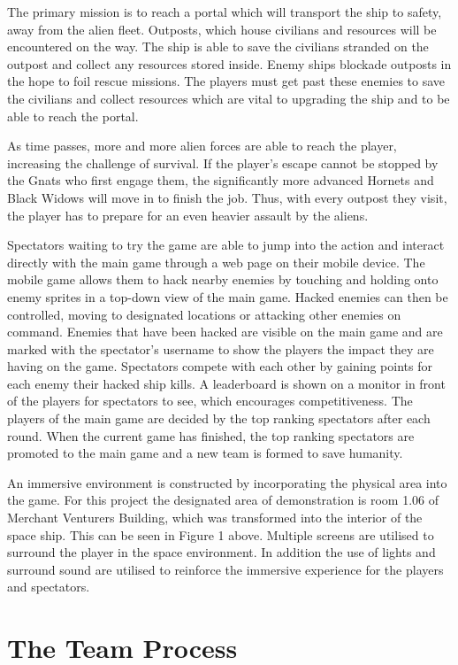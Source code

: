 \documentclass[a4paper,11pt]{article}
\begin{document}
The primary mission is to reach a portal which will transport the ship to safety, away from the alien fleet. Outposts, which house civilians and resources will be encountered on the way. The ship is able to save the civilians stranded on the outpost and collect any resources stored inside. Enemy ships blockade outposts in the hope to foil rescue missions. The players must get past these enemies to save the civilians and collect resources which are vital to upgrading the ship and to be able to reach the portal.

As time passes, more and more alien forces are able to reach the player, increasing the challenge of survival. If the player's escape cannot be stopped by the Gnats who first engage them, the significantly more advanced Hornets and Black Widows will move in to finish the job. Thus, with every outpost they visit, the player has to prepare for an even heavier assault by the aliens.



Spectators waiting to try the game are able to jump into the action and interact directly with the main game through a web page on their mobile device. The mobile game allows them to hack nearby enemies by touching and holding onto enemy sprites in a top-down view of the main game. Hacked enemies can then be controlled, moving to designated locations or attacking other enemies on command. Enemies that have been hacked are visible on the main game and are marked with the spectator’s username to show the players the impact they are having on the game. Spectators compete with each other by gaining points for each enemy their hacked ship kills. A leaderboard is shown on a monitor in front of the players for spectators to see, which encourages competitiveness. The players of the main game are decided by the top ranking spectators after each round. When the current game has finished, the top ranking spectators are promoted to the main game and a new team is formed to save humanity.

An immersive environment is constructed by incorporating the physical area into the game. For this project the designated area of demonstration is room 1.06 of Merchant Venturers Building, which was transformed into the interior of the space ship. This can be seen in Figure 1 above. Multiple screens are utilised to surround the player in the space environment. In addition the use of lights and surround sound are utilised to reinforce the immersive experience for the players and spectators. 

\section{The Team Process}
\end{document}
